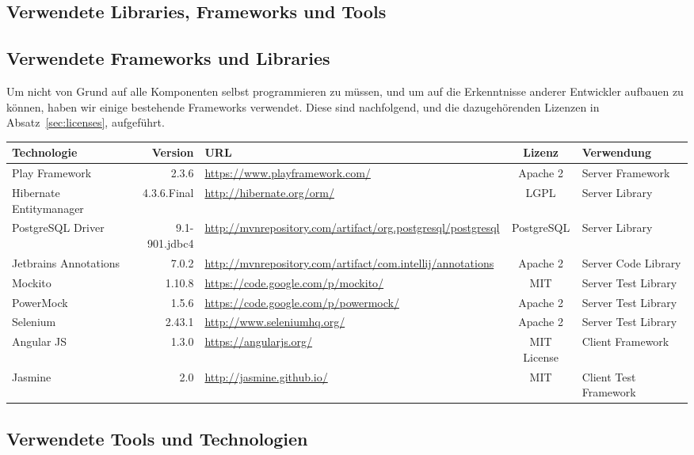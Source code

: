 \begin{landscape}
\chapter{Verwendete Libraries, Frameworks und Tools}

	\section{Verwendete Frameworks und Libraries}		
	Um nicht von Grund auf alle Komponenten selbst programmieren zu müssen, 
	und um auf die Erkenntnisse anderer Entwickler aufbauen zu können,
	haben wir einige bestehende Frameworks verwendet.
	Diese sind nachfolgend, und die dazugehörenden Lizenzen in Absatz\ \ref{sec:licenses}, aufgeführt.
	
	
	\vspace{0.5cm}
	
	\newcommand{\addLib}[5]{
		#1 & #2 & \url{#3} & #4 & #5 \\
		\hline
	}
	
	
	\begin{tabularx}{\linewidth}{| l r | X | c | l |}
		\hline
		\textbf{Technologie} & \textbf{Version} & \textbf{URL} & \textbf{Lizenz} & \textbf{Verwendung} \\
		\hline \hline
		\addLib{Play Framework}{2.3.6}{https://www.playframework.com/}{Apache 2}{Server Framework}
		\addLib{Hibernate Entitymanager}{4.3.6.Final}{http://hibernate.org/orm/}{LGPL}{Server Library}
		\addLib{PostgreSQL Driver}{9.1-901.jdbc4}{http://mvnrepository.com/artifact/org.postgresql/postgresql}{PostgreSQL}{Server Library}
		\addLib{Jetbrains Annotations}{7.0.2}{http://mvnrepository.com/artifact/com.intellij/annotations}{Apache 2}{Server Code Library}
		\addLib{Mockito}{1.10.8}{https://code.google.com/p/mockito/}{MIT}{Server Test Library}
		\addLib{PowerMock}{1.5.6}{https://code.google.com/p/powermock/}{Apache 2}{Server Test Library}
		\addLib{Selenium}{2.43.1}{http://www.seleniumhq.org/}{Apache 2}{Server Test Library}
		\addLib{Angular JS}{1.3.0}{https://angularjs.org/}{MIT License}{Client Framework}
		\addLib{Jasmine}{2.0}{http://jasmine.github.io/}{MIT}{Client Test Framework}
	\end{tabularx}

	\section{Verwendete Tools und Technologien}
	

\end{landscape}

